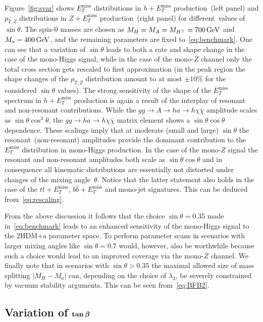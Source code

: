 \documentclass[a4paper, 11pt,notoc]{article}
\newcommand{\MET}{\ensuremath{E_T^\mathrm{miss}}\xspace}
\newcommand{\mA}{\ensuremath{M_{A}}\xspace}
\newcommand{\ma}{\ensuremath{M_{a}}\xspace}
\newcommand{\mH}{\ensuremath{M_{H}}\xspace}
\newcommand{\mHc}{\ensuremath{M_{H^{\pm}}}\xspace}
\newcommand{\hdma}{\ensuremath{\textrm{2HDM+a}}\xspace}
\def\bm#1{\mbox{\boldmath$#1$\unboldmath}}
\begin{document}
Figure~\ref{fig:svar} shows $\MET$ distributions in $h + \MET$ production~(left panel) and $p_{T,Z}$ distributions in $Z+\MET$ production~(right panel) for different~values of $\sin \theta$. The spin-0 masses are chosen as $\mH = \mA = \mHc = 700 \, {\rm GeV}$ and $\ma = 400 \, {\rm GeV}$, and the remaining parameters are fixed to~\eqref{eq:benchmark}.   One can see that a variation of $\sin \theta$ leads to both a rate and shape change in the case of the mono-Higgs signal, while in the case of the mono-$Z$ channel only the total cross section gets rescaled to first approximation (in the peak region the shape changes of the $p_{T,Z}$ distribution amount to at most $\pm 10\%$ for the considered $\sin \theta$ values). The strong sensitivity of the shape of the $\MET$ spectrum in $h + \MET$ production is again a result of the interplay of resonant and non-resonant contributions. While the $gg \to A \to h a \to h \chi \bar \chi$  amplitude scales as $\sin \theta \cos^3 \theta$, the $gg \to h a  \to h \chi \bar \chi$ matrix element shows a $\sin \theta \cos \theta$ dependence. These scalings imply that at moderate  (small and large) $\sin \theta$ the resonant~(non-resonant) amplitudes provide the dominant contribution to the $\MET$ distribution in mono-Higgs production.  In the case of the mono-$Z$ signal the resonant and non-resonant amplitudes both scale as $\sin \theta \cos \theta$ and in consequence  all kinematic distributions are essentially not distorted  under changes of the mixing angle~$\theta$. Notice that the latter statement also holds in the case of the $t \bar t +\MET$, $b \bar b + \MET$ and mono-jet signatures.  This can be deduced from~\eqref{eq:rescaling}. 

From the above discussion it follows that the choice $\sin \theta = 0.35$ made in~\eqref{eq:benchmark} leads to an enhanced sensitivity of the mono-Higgs signal to the \hdma parameter space. To perform parameter scans in scenarios with larger mixing angles like $\sin \theta = 0.7$ would, however, also be worthwhile because such a choice would lead to an improved coverage via the mono-$Z$ channel. We finally note that in scenarios with $\sin \theta >0.35$ the maximal allowed size of mass splitting $|M_H - M_a|$ can, depending on the choice of $\lambda_3$, be severely constrained by vacuum stability arguments. This can be seen from~\eqref{eq:BFB2}. 

\subsection*{Variation of $\bm{\tan \beta}$}
\end{document}
